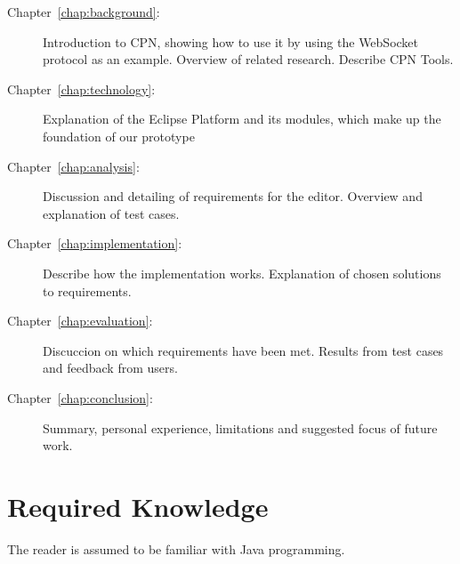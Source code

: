 \begin{description}
\item[Chapter~\ref{chap:background}:~] Introduction to
CPN, showing how to use it by using the WebSocket protocol as an example.
Overview of related research. Describe CPN Tools.
\item [Chapter~\ref{chap:technology}:~] Explanation of
the Eclipse Platform and its modules, which make up the foundation of our
prototype
\item [Chapter~\ref{chap:analysis}:~] Discussion and
detailing of requirements for the editor. Overview and explanation of test cases.
\item [Chapter~\ref{chap:implementation}:~]
Describe how the implementation works. Explanation of chosen solutions to requirements. 
\item [Chapter~\ref{chap:evaluation}:~] Discuccion on
which requirements have been met. Results from test cases and feedback from
users.
\item [Chapter~\ref{chap:conclusion}:~] Summary,
personal experience, limitations and suggested focus of future work.
\end{description}

\section{Required Knowledge}

The reader is assumed to be familiar with Java programming.